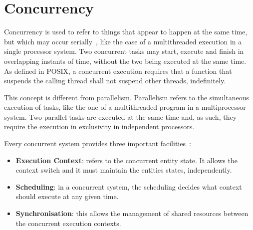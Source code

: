 \section{Concurrency}%
\label{sec:concurrency}
Concurrency is used to refer to things that appear to happen at the same time,
but which may occur serially~\cite{buttlar1996pthreads}, like the case of a multithreaded execution in
a single processor system.
Two concurrent tasks may start, execute and finish in overlapping instants of
time, without the two being executed at the same time.
As defined in POSIX, a concurrent execution requires that a function that
suspends the calling thread shall not suspend other threads, indefinitely.

This concept is different from parallelism. Parallelism refers to the
simultaneous execution of tasks, like the one of a multithreaded program in a
multiprocessor system.
Two parallel tasks are executed at the same time and, as such, they require
the execution in exclusivity in independent processors.

Every concurrent system provides three important facilities~\cite{buttlar1996pthreads}:
\begin{itemize}
\item \textbf{Execution Context}: refers to the concurrent entity state. It
  allows the context switch and it must maintain the entities states,
  independently.
\item \textbf{Scheduling}: in a concurrent system, the scheduling decides what
  context should execute at any given time.
\item \textbf{Synchronisation}: this allows the management of shared resources
  between the concurrent execution contexts.
\end{itemize}

